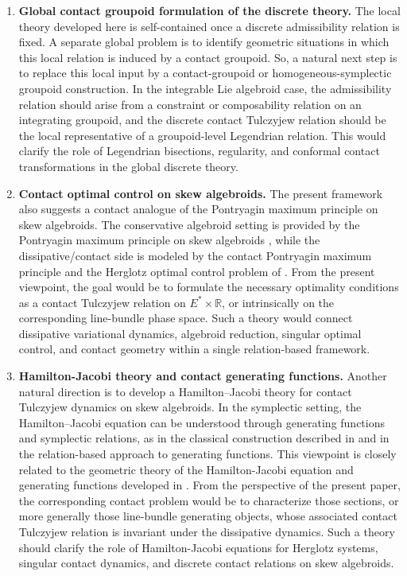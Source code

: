\documentclass[11pt]{article}
\newcommand{\R}{\mathbb{R}}
\begin{document}
\begin{enumerate}
\item \textbf{Global contact groupoid formulation of the discrete theory.}
The local theory developed here is self-contained once a discrete admissibility
relation is fixed. A separate global problem is to identify geometric situations
in which this local relation is induced by a contact groupoid. So, a natural next step is to replace this
local input by a contact-groupoid or homogeneous-symplectic groupoid
construction. In the integrable Lie algebroid case, the admissibility relation
should arise from a constraint or composability relation on an integrating
groupoid, and the discrete contact Tulczyjew relation should be the local
representative of a groupoid-level Legendrian relation. This would clarify the
role of Legendrian bisections, regularity, and conformal contact transformations
in the global discrete theory.

\item \textbf{Contact optimal control on skew algebroids.}
The present framework also suggests a contact analogue of the Pontryagin
maximum principle on skew algebroids. The conservative algebroid setting is
provided by the Pontryagin maximum principle on skew algebroids
\cite{GrabowskiJozwikowski2011}, while the dissipative/contact side is modeled
by the contact Pontryagin maximum principle and the Herglotz optimal control
problem of \cite{deLeonLainzMunozLecanda2023}. From the present viewpoint, the
goal would be to formulate the necessary optimality conditions as a contact
Tulczyjew relation on \(E^*\times\R\), or intrinsically on the corresponding
line-bundle phase space. Such a theory would connect dissipative variational
dynamics, algebroid reduction, singular optimal control, and contact geometry
within a single relation-based framework.

\item \textbf{Hamilton-Jacobi theory and contact generating functions.}
Another natural direction is to develop a Hamilton--Jacobi theory for contact
Tulczyjew dynamics on skew algebroids. In the symplectic setting, the
Hamilton--Jacobi equation can be understood through generating functions and
symplectic relations, as in the classical construction described in \cite{AbrahamMarsden1978} and in the relation-based approach to generating functions.
This viewpoint is closely related to the geometric theory of the
Hamilton-Jacobi equation and generating functions developed in 
\cite{FerraroDeLeonMarreroMartinVaquero2017}. From the perspective of
the present paper, the corresponding contact problem would be to characterize
those sections, or more generally those line-bundle generating objects, whose
associated contact Tulczyjew relation is invariant under the dissipative
dynamics. Such a theory should clarify the role of Hamilton-Jacobi equations
for Herglotz systems, singular contact dynamics, and discrete contact
relations on skew algebroids.
\end{enumerate}
\end{document}
